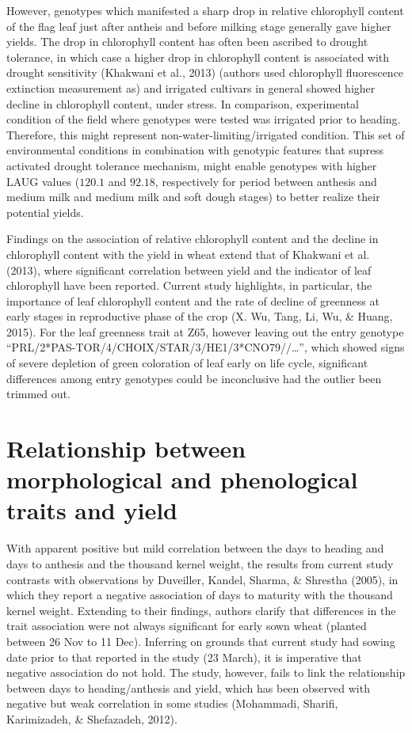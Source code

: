 \documentclass[12pt,oneside]{dukestatscithesis} %
\theoremstyle{definition}
\theoremstyle{definition}
\theoremstyle{definition}
\theoremstyle{remark}
\begin{document}
However, genotypes which manifested a sharp drop in relative chlorophyll
content of the flag leaf just after antheis and before milking stage
generally gave higher yields. The drop in chlorophyll content has often
been ascribed to drought tolerance, in which case a higher drop in
chlorophyll content is associated with drought sensitivity (Khakwani et
al., 2013) (authors used chlorophyll fluorescence extinction measurement
as) and irrigated cultivars in general showed higher decline in
chlorophyll content, under stress. In comparison, experimental condition
of the field where genotypes were tested was irrigated prior to heading.
Therefore, this might represent non-water-limiting/irrigated condition.
This set of environmental conditions in combination with genotypic
features that supress activated drought tolerance mechanism, might
enable genotypes with higher LAUG values (\(120.1\) and \(92.18\),
respectively for period between anthesis and medium milk and medium milk
and soft dough stages) to better realize their potential yields.

Findings on the association of relative chlorophyll content and the
decline in chlorophyll content with the yield in wheat extend that of
Khakwani et al. (2013), where significant correlation between yield and
the indicator of leaf chlorophyll have been reported. Current study
highlights, in particular, the importance of leaf chlorophyll content
and the rate of decline of greenness at early stages in reproductive
phase of the crop (X. Wu, Tang, Li, Wu, \& Huang, 2015). For the leaf
greenness trait at Z65, however leaving out the entry genotype
``PRL/2*PAS-TOR/4/CHOIX/STAR/3/HE1/3*CNO79//\ldots{}'', which showed
signs of severe depletion of green coloration of leaf early on life
cycle, significant differences among entry genotypes could be
inconclusive had the outlier been trimmed out.

\section{Relationship between morphological and phenological traits and
yield}\label{relationship-between-morphological-and-phenological-traits-and-yield}

With apparent positive but mild correlation between the days to heading
and days to anthesis and the thousand kernel weight, the results from
current study contrasts with observations by Duveiller, Kandel, Sharma,
\& Shrestha (2005), in which they report a negative association of days
to maturity with the thousand kernel weight. Extending to their
findings, authors clarify that differences in the trait association were
not always significant for early sown wheat (planted between 26 Nov to
11 Dec). Inferring on grounds that current study had sowing date prior
to that reported in the study (23 March), it is imperative that negative
association do not hold. The study, however, fails to link the
relationship between days to heading/anthesis and yield, which has been
observed with negative but weak correlation in some studies (Mohammadi,
Sharifi, Karimizadeh, \& Shefazadeh, 2012).
\end{document}

